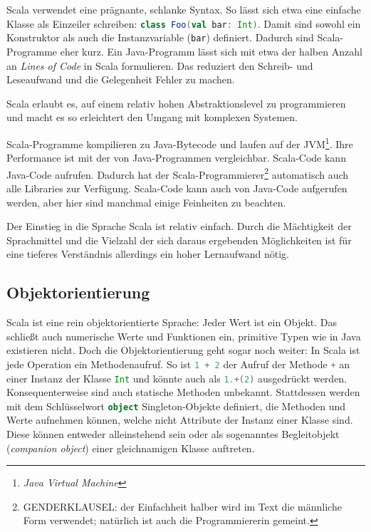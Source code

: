 \documentclass[a4paper, 12pt, hidelinks, listof=totoc, listoftables=totoc, bibliography=totoc]{scrreprt}
\newcommand{\scala}[1]{\lstinline[language=Scala, style=inline]|#1|}
\begin{document}
Scala verwendet eine prägnante, schlanke Syntax. So lässt sich etwa eine einfache Klasse als Einzeiler schreiben: \scala{class Foo(val bar: Int)}. Damit sind sowohl ein Konstruktor als auch die Instanzvariable (\scala{bar}) definiert. Dadurch sind Scala-Programme eher kurz. Ein Java-Programm lässt sich mit etwa der halben Anzahl an \textit{Lines of Code} in Scala formulieren. Das reduziert den Schreib- und Leseaufwand und die Gelegenheit Fehler zu machen.

Scala erlaubt es, auf einem relativ hohen Abstraktionslevel zu programmieren und macht es so erleichtert den Umgang mit komplexen Systemen.

Scala-Programme kompilieren zu Java-Bytecode und laufen auf der JVM\footnote{\textit{Java Virtual Machine}}. Ihre Performance ist mit der von Java-Programmen vergleichbar. Scala-Code kann Java-Code aufrufen. Dadurch hat der Scala-Programmierer\footnote{GENDERKLAUSEL: der Einfachheit halber wird im Text die männliche Form verwendet; natürlich ist auch die Programmiererin gemeint.} automatisch auch alle Libraries zur Verfügung. Scala-Code kann auch von Java-Code aufgerufen werden, aber hier sind manchmal einige Feinheiten zu beachten.\cite[S. 13 ff.]{odersky2008.PIS}

Der Einstieg in die Sprache Scala ist relativ einfach. Durch die Mächtigkeit der Sprachmittel und die Vielzahl der sich daraus ergebenden Möglichkeiten ist für eine tieferes Verständnis allerdings ein hoher Lernaufwand nötig.



\subsection{Objektorientierung}

Scala ist eine rein objektorientierte Sprache: Jeder Wert ist ein Objekt. Das schließt auch numerische Werte und Funktionen ein, primitive Typen wie in Java existieren nicht. Doch die Objektorientierung geht sogar noch weiter: In Scala ist jede Operation ein Methodenaufruf. So ist \scala{1 + 2} der Aufruf der Methode \scala{+} an einer Instanz der Klasse \scala{Int} und könnte auch als \scala{1.+(2)} ausgedrückt werden. Konsequenterweise sind auch statische Methoden unbekannt. Stattdessen werden mit dem Schlüsselwort \scala{object} Singleton-Objekte definiert, die Methoden und Werte aufnehmen können, welche nicht Attribute der Instanz einer Klasse sind. Diese können entweder alleinstehend sein oder als sogenanntes Begleitobjekt (\textit{companion object}) einer gleichnamigen Klasse auftreten.
\end{document}
